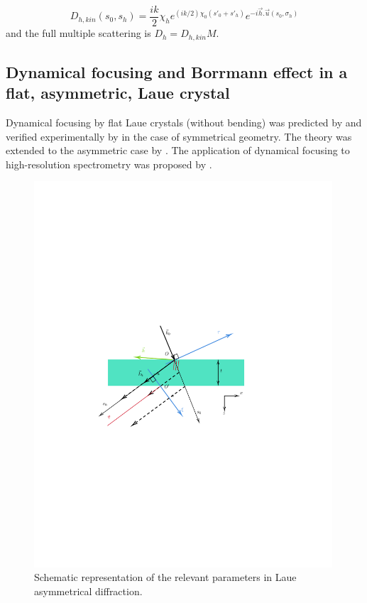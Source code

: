 \documentclass[preprint]{iucr}              %
\begin{document}
\begin{equation}
\label{eq:kummerapprox}
    D_{h,kin}(s_0,s_h) = \frac{i k }{2} \chi_h e^{(ik/2) \chi_0 (s'_0 + s'_h)} e^{-i \vec h . \vec u (s_0,\sigma_h)} 
\end{equation}
and the full multiple scattering is $D_h=D_{h,kin} M$.
          
\subsection{Dynamical focusing and Borrmann effect in a flat, asymmetric, Laue crystal}
\label{sec:LaueFlat}


Dynamical focusing by flat Laue crystals (without bending) was predicted by  and verified experimentally by \cite{Aristov1978,Aristov1980PhysStatSol,Aristov1980}
in the case of symmetrical geometry. The theory was extended to the asymmetric case by . The application of dynamical focusing to high-resolution spectrometry was proposed by .

\begin{figure}
\label{fig:laue}
\caption{Schematic representation of the relevant parameters in Laue asymmetrical diffraction.
}
\includegraphics[width=0.99\textwidth,trim=3cm 10cm 5cm 10cm,clip=true]{fig3.pdf}
\end{figure}
\end{document}
